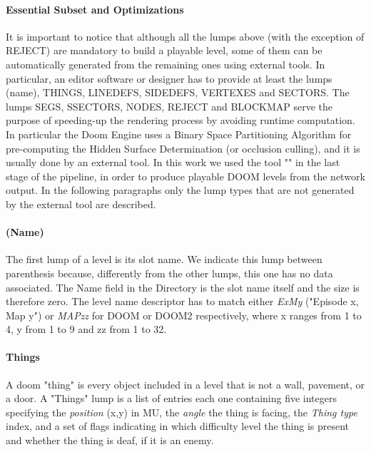 \paragraph{Essential Subset and Optimizations} It is important to notice that although all the lumps above (with the exception of REJECT) are mandatory to build a playable level, some of them can be automatically generated from the remaining ones using external tools. In particular, an editor software or designer has to provide at least the lumps (name), THINGS, LINEDEFS, SIDEDEFS, VERTEXES and SECTORS. The lumps SEGS, SSECTORS, NODES, REJECT and BLOCKMAP serve the purpose of speeding-up the rendering process by avoiding runtime computation. In particular the Doom Engine uses a Binary Space Partitioning Algorithm \cite{Fuchs:1980:VSG:965105.807481} for pre-computing the Hidden Surface Determination (or occlusion culling), and it is usually done by an external tool. In this work we used the tool "" \cite{bsp} in the last stage of the pipeline, in order to produce playable DOOM levels from the network output. In the following paragraphs only the lump types that are not generated by the external tool are described.

\paragraph{(Name)} \label{slotname} The first lump of a level is its slot name. We indicate this lump between parenthesis because, differently from the other lumps, this one has no data associated. The Name field in the Directory is the slot name itself and the size is therefore zero. The level name descriptor has to match either \textit{ExMy} ("Episode x, Map y") or \textit{MAPzz} for DOOM or DOOM2 respectively, where x ranges from 1 to 4, y from 1 to 9 and zz from 1 to 32.


\paragraph{Things} A doom "\gls{thing}" is every object included in a level that is not a wall, pavement, or a door. A "Things" lump is a list of entries each one containing five integers specifying the \textit{position} (x,y) in \gls{MU}, the \textit{angle} the thing is facing, the \textit{Thing type} index, and a set of flags indicating in which difficulty level the thing is present and whether the thing is deaf, if it is an enemy.

